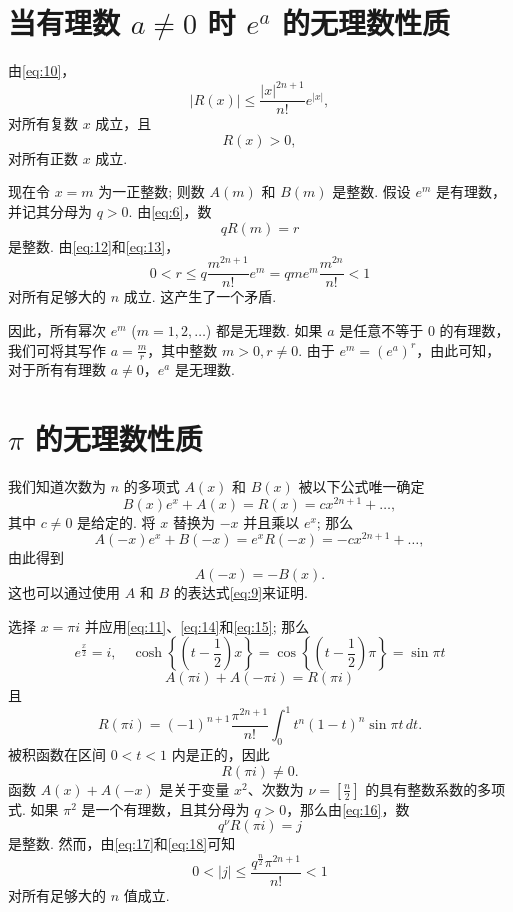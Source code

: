 \section{当有理数 $a \neq 0$ 时 $e^a$ 的无理数性质}

由\eqref{eq:10}，
\begin{equation} |R(x)| \leq \frac{|x|^{2n+1}}{n!} e^{|x|}, \tag{12}\label{eq:12} \end{equation}
对所有复数 $x$ 成立，且
\begin{equation} R(x) > 0, \tag{13}\label{eq:13} \end{equation}
对所有正数 $x$ 成立.

现在令 $x = m$ 为一正整数; 则数 $A(m)$ 和 $B(m)$ 是整数. 假设 $e^m$ 是有理数，并记其分母为 $q > 0$. 由\eqref{eq:6}，数
\[ q R(m) = r \]
是整数. 由\eqref{eq:12}和\eqref{eq:13}，
\[ 0 < r \leq q \frac{m^{2n+1}}{n!} e^m = q m e^m \frac{m^{2n}}{n!} < 1 \]
对所有足够大的 $n$ 成立. 这产生了一个矛盾.

因此，所有幂次 $e^m$ ($m=1,2,\dots$) 都是无理数. 如果 $a$ 是任意不等于 $0$ 的有理数，我们可将其写作 $a=\frac{m}{r}$，其中整数 $m>0, r \neq 0$. 由于 $e^m=(e^a)^r$，由此可知，对于所有有理数 $a \neq 0$，$e^a$ 是无理数.

\section{$\pi$ 的无理数性质}

我们知道次数为 $n$ 的多项式 $A(x)$ 和 $B(x)$ 被以下公式唯一确定
\begin{equation} B(x)e^{x} + A(x) = R(x) = cx^{2n+1} + \dots, \tag{14}\label{eq:14} \end{equation}
其中 $c \neq 0$ 是给定的. 将 $x$ 替换为 $-x$ 并且乘以 $e^{x}$; 那么
\[ A(-x)e^{x} + B(-x) = e^{x}R(-x) = -cx^{2n+1} + \dots, \]
由此得到
\begin{equation} A(-x) = -B(x). \tag{15}\label{eq:15} \end{equation}
这也可以通过使用 $A$ 和 $B$ 的表达式\eqref{eq:9}来证明.

选择 $x=\pi i$ 并应用\eqref{eq:11}、\eqref{eq:14}和\eqref{eq:15}; 那么
\[ e^{\frac{x}{2}} = i, \quad \cosh \left\{\left(t-\frac{1}{2}\right)x\right\} = \cos \left\{\left(t-\frac{1}{2}\right)\pi\right\} = \sin \pi t \]
\begin{equation} A(\pi i) + A(-\pi i) = R(\pi i) \tag{16}\label{eq:16} \end{equation}
且
\begin{equation} R(\pi i) = (-1)^{n+1} \frac{\pi^{2n+1}}{n!} \int_0^1 t^n (1-t)^n \sin \pi t \, dt. \tag{17}\label{eq:17} \end{equation}
被积函数在区间 $0 < t < 1$ 内是正的，因此
\[ R(\pi i) \neq 0. \]
函数 $A(x) + A(-x)$ 是关于变量 $x^2$、次数为 $\nu = \left[\frac{n}{2}\right]$ 的具有整数系数的多项式. 如果 $\pi^2$ 是一个有理数，且其分母为 $q > 0$，那么由\eqref{eq:16}，数
\begin{equation} q^{\nu} R(\pi i) = j \tag{18}\label{eq:18} \end{equation}
是整数. 然而，由\eqref{eq:17}和\eqref{eq:18}可知
\[ 0 < |j| \leq \frac{q^{\frac{n}{2}} \pi^{2n+1}}{n!} < 1 \]
对所有足够大的 $n$ 值成立.

